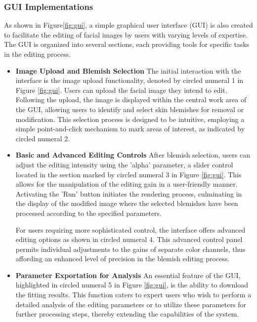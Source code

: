 \begin{spacing}{1.5}
\subsubsection{GUI Implementations}
\vspace{-1.2em}
As shown in Figure\ref{fig:gui}, a simple graphical user interface (GUI) is also created to facilitate the editing of facial images by users with varying levels of expertise. The GUI is organized into several sections, each providing tools for specific tasks in the editing process.
\begin{itemize}
    \item \textbf{Image Upload and Blemish Selection} The initial interaction with the interface is the image upload functionality, denoted by circled numeral 1 in Figure \ref{fig:gui}. Users can upload the facial image they intend to edit. Following the upload, the image is displayed within the central work area of the GUI, allowing users to identify and select skin blemishes for removal or modification. This selection process is designed to be intuitive, employing a simple point-and-click mechanism to mark areas of interest, as indicated by circled numeral 2.
    \item \textbf{Basic and Advanced Editing Controls} After blemish selection, users can adjust the editing intensity using the 'alpha' parameter, a slider control located in the section marked by circled numeral 3 in Figure \ref{fig:gui}. This allows for the manipulation of the editing gain in a user-friendly manner. Activating the 'Run' button initiates the rendering process, culminating in the display of the modified image where the selected blemishes have been processed according to the specified parameters.

    For users requiring more sophisticated control, the interface offers advanced editing options as shown in circled numeral 4. This advanced control panel permits individual adjustments to the gains of separate color channels, thus affording an enhanced level of precision in the blemish editing process.
    \item \textbf{Parameter Exportation for Analysis} An essential feature of the GUI, highlighted in circled numeral 5 in Figure \ref{fig:gui}, is the ability to download the fitting results. This function caters to expert users who wish to perform a detailed analysis of the editing parameters or to utilize these parameters for further processing steps, thereby extending the capabilities of the system.
\end{itemize}
\end{spacing}
\newpage
